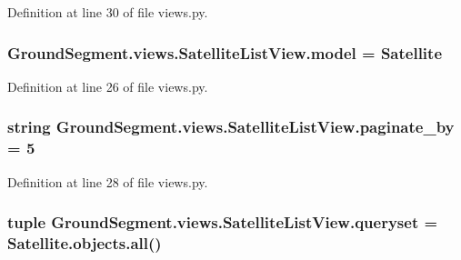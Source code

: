 Definition at line 30 of file views.\+py.

\hypertarget{class_ground_segment_1_1views_1_1_satellite_list_view_aca49b82a0728d4d774225851f66e6a70}{}
\subsubsection[{model}]{\setlength{\rightskip}{0pt plus 5cm}Ground\+Segment.\+views.\+Satellite\+List\+View.\+model = {\bf Satellite}\hspace{0.3cm}{\ttfamily [static]}}\label{class_ground_segment_1_1views_1_1_satellite_list_view_aca49b82a0728d4d774225851f66e6a70}


Definition at line 26 of file views.\+py.

\hypertarget{class_ground_segment_1_1views_1_1_satellite_list_view_a611ab80fb5c5c2e75a819efcb5f6c0f8}{}
\subsubsection[{paginate\+\_\+by}]{\setlength{\rightskip}{0pt plus 5cm}string Ground\+Segment.\+views.\+Satellite\+List\+View.\+paginate\+\_\+by = \textquotesingle{}5\textquotesingle{}\hspace{0.3cm}{\ttfamily [static]}}\label{class_ground_segment_1_1views_1_1_satellite_list_view_a611ab80fb5c5c2e75a819efcb5f6c0f8}


Definition at line 28 of file views.\+py.

\hypertarget{class_ground_segment_1_1views_1_1_satellite_list_view_ae1fb474282cc7cf2bb1497743fcb7b76}{}
\subsubsection[{queryset}]{\setlength{\rightskip}{0pt plus 5cm}tuple Ground\+Segment.\+views.\+Satellite\+List\+View.\+queryset = Satellite.\+objects.\+all()\hspace{0.3cm}{\ttfamily [static]}}\label{class_ground_segment_1_1views_1_1_satellite_list_view_ae1fb474282cc7cf2bb1497743fcb7b76}


